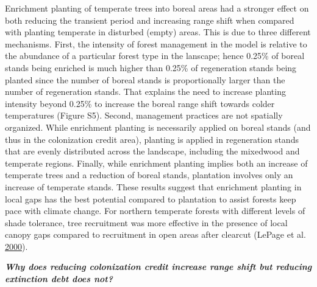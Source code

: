 \documentclass[12pt]{article}
\begin{document}
Enrichment planting of temperate trees into boreal areas had a stronger
effect on both reducing the transient period and increasing range shift
when compared with planting temperate in disturbed (empty) areas. This
is due to three different mechanisms. First, the intensity of forest
management in the model is relative to the abundance of a particular
forest type in the lanscape; hence 0.25\% of boreal stands being
enriched is much higher than 0.25\% of regeneration stands being planted
since the number of boreal stands is proportionally larger than the
number of regeneration stands. That explains the need to increase
planting intensity beyond 0.25\% to increase the boreal range shift
towards colder temperatures (Figure S5). Second, management practices
are not spatially organized. While enrichment planting is necessarily
applied on boreal stands (and thus in the colonization credit area),
planting is applied in regeneration stands that are evenly distributed
across the landscape, including the mixedwood and temperate regions.
Finally, while enrichment planting implies both an increase of temperate
trees and a reduction of boreal stands, plantation involves only an
increase of temperate stands. These results suggest that enrichment
planting in local gaps has the best potential compared to plantation to
assist forests keep pace with climate change. For northern temperate
forests with different levels of shade tolerance, tree recruitment was
more effective in the presence of local canopy gaps compared to
recruitment in open areas after clearcut (LePage et al.
\protect\hyperlink{ref-LePage2000}{2000}).

\textbf{\emph{Why does reducing colonization credit increase range shift
but reducing extinction debt does not?}}
\end{document}
